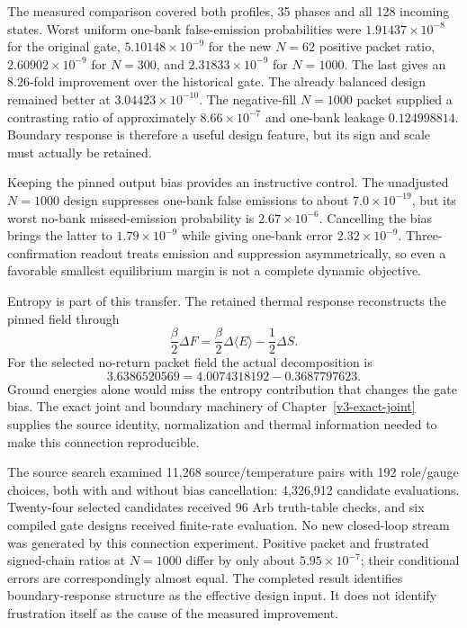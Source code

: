 The measured comparison covered both profiles, 35 phases and all 128 incoming states. Worst uniform one-bank false-emission probabilities were $1.91437\times10^{-8}$ for the original gate, $5.10148\times10^{-9}$ for the new $N=62$ positive packet ratio, $2.60902\times10^{-9}$ for $N=300$, and $2.31833\times10^{-9}$ for $N=1000$. The last gives an $8.26$-fold improvement over the historical gate. The already balanced design remained better at $3.04423\times10^{-10}$. The negative-fill $N=1000$ packet supplied a contrasting ratio of approximately $8.66\times10^{-7}$ and one-bank leakage $0.124998814$. Boundary response is therefore a useful design feature, but its sign and scale must actually be retained.

Keeping the pinned output bias provides an instructive control. The unadjusted $N=1000$ design suppresses one-bank false emissions to about $7.0\times10^{-19}$, but its worst no-bank missed-emission probability is $2.67\times10^{-6}$. Cancelling the bias brings the latter to $1.79\times10^{-9}$ while giving one-bank error $2.32\times10^{-9}$. Three-confirmation readout treats emission and suppression asymmetrically, so even a favorable smallest equilibrium margin is not a complete dynamic objective.

Entropy is part of this transfer. The retained thermal response reconstructs the pinned field through
\[
 \frac{\beta}{2}\Delta F
 =\frac{\beta}{2}\Delta\langle E\rangle-\frac12\Delta S.
\]
For the selected no-return packet field the actual decomposition is
\[
 3.6386520569=4.0074318192-0.3687797623.
\]
Ground energies alone would miss the entropy contribution that changes the gate bias. The exact joint and boundary machinery of Chapter~\ref{v3-exact-joint} supplies the source identity, normalization and thermal information needed to make this connection reproducible.

The source search examined 11,268 source/temperature pairs with 192 role/gauge choices, both with and without bias cancellation: 4,326,912 candidate evaluations. Twenty-four selected candidates received 96 Arb truth-table checks, and six compiled gate designs received finite-rate evaluation. No new closed-loop stream was generated by this connection experiment. Positive packet and frustrated signed-chain ratios at $N=1000$ differ by only about $5.95\times10^{-7}$; their conditional errors are correspondingly almost equal. The completed result identifies boundary-response structure as the effective design input. It does not identify frustration itself as the cause of the measured improvement.

